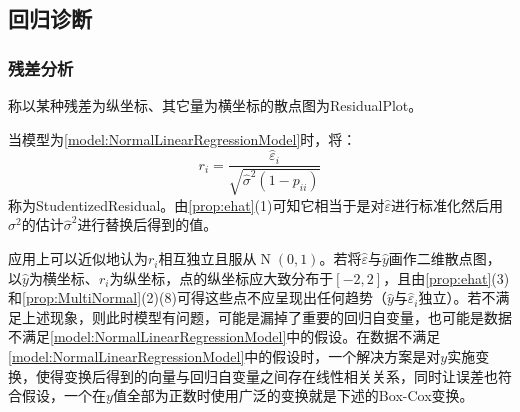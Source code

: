 \subsection{回归诊断}
\subsubsection{残差分析}
\begin{definition}
	称以某种残差为纵坐标、其它量为横坐标的散点图为\gls{ResidualPlot}。
\end{definition}
\begin{definition}
	当模型为\cref{model:NormalLinearRegressionModel}时，将：
	\begin{equation*}
		r_i=\frac{\hat{\varepsilon}_i}{\sqrt{\hat{\sigma}^2(1-p_{ii})}}
	\end{equation*}
	称为\gls{StudentizedResidual}。由\cref{prop:ehat}(1)可知它相当于是对$\hat{\varepsilon}$进行标准化然后用$\sigma^2$的估计$\hat{\sigma}^2$进行替换后得到的值。
\end{definition}
\begin{note}
	应用上可以近似地认为$r_i$相互独立且服从$\operatorname{N}(0,1)$。若将$\hat{\varepsilon}$与$\hat{y}$画作二维散点图，以$\hat{y}$为横坐标、$r_i$为纵坐标，点的纵坐标应大致分布于$[-2,2]$，且由\cref{prop:ehat}(3)和\cref{prop:MultiNormal}(2)(8)可得这些点不应呈现出任何趋势（$\hat{y}$与$\hat{\varepsilon}_i$独立）。若不满足上述现象，则此时模型有问题，可能是漏掉了重要的回归自变量，也可能是数据不满足\cref{model:NormalLinearRegressionModel}中的假设。在数据不满足\cref{model:NormalLinearRegressionModel}中的假设时，一个解决方案是对$y$实施变换，使得变换后得到的向量与回归自变量之间存在线性相关关系，同时让误差也符合假设，一个在$y$值全部为正数时使用广泛的变换就是下述的Box-Cox变换。
\end{note}
